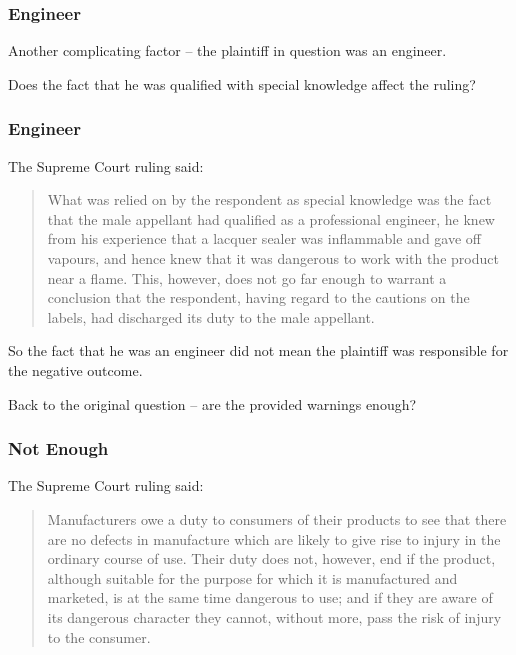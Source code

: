 \begin{frame}
\frametitle{Engineer}

Another complicating factor -- the plaintiff in question was an engineer.

Does the fact that he was qualified with special knowledge affect the ruling?


\end{frame}

\begin{frame}
\frametitle{Engineer}

The Supreme Court ruling said:

\begin{quote}
What was relied on by the respondent as special knowledge was the fact that the male appellant had qualified as a professional engineer, he knew from his experience that a lacquer sealer was inflammable and gave off vapours, and hence knew that it was dangerous to work with the product near a flame. This, however, does not go far enough to warrant a conclusion that the respondent, having regard to the cautions on the labels, had discharged its duty to the male appellant.
\end{quote}

So the fact that he was an engineer did not mean the plaintiff was responsible for the negative outcome.

Back to the original question -- are the provided warnings enough?

\end{frame}

\begin{frame}
\frametitle{Not Enough}
The Supreme Court ruling said:

\begin{quote}
Manufacturers owe a duty to consumers of their products to see that there are no defects in manufacture which are likely to give rise to injury in the ordinary course of use. Their duty does not, however, end if the product, although suitable for the purpose for which it is manufactured and marketed, is at the same time dangerous to use; and if they are aware of its dangerous character they cannot, without more, pass the risk of injury to the consumer.

\end{quote}

\end{frame}

